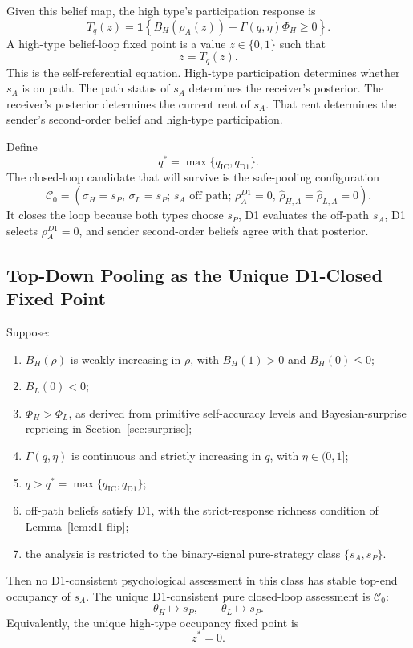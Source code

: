 Given this belief map, the high type's participation response is
\[
T_q(z)
=
\mathbf{1}\left\{
B_H(\rho_A(z))-\Gamma(q,\eta)\Phi_H\ge 0
\right\}.
\]
A high-type belief-loop fixed point is a value \(z\in\{0,1\}\) such that
\[
z=T_q(z).
\]
This is the self-referential equation. High-type participation determines whether \(s_A\) is on path. The path status of \(s_A\) determines the receiver's posterior. The receiver's posterior determines the current rent of \(s_A\). That rent determines the sender's second-order belief and high-type participation.

Define
\[
q^*=\max\{q_{\mathrm{IC}},q_{\mathrm{D1}}\}.
\]
The closed-loop candidate that will survive is the safe-pooling configuration
\[
\mathcal C_0
=
\left(
\sigma_H=s_P,\,
\sigma_L=s_P;\,
s_A\text{ off path};\,
\rho_A^{D1}=0,\,
\widehat\rho_{H,A}=\widehat\rho_{L,A}=0
\right).
\]
It closes the loop because both types choose \(s_P\), D1 evaluates the off-path \(s_A\), D1 selects \(\rho_A^{D1}=0\), and sender second-order beliefs agree with that posterior.

\subsection{Top-Down Pooling as the Unique D1-Closed Fixed Point}
\label{subsec:d1-closed-fixed-point}

\begin{theorem}
\label{thm:top-down-pooling}
Suppose:
\begin{enumerate}
\item \(B_H(\rho)\) is weakly increasing in \(\rho\), with \(B_H(1)>0\) and \(B_H(0)\le 0\);
\item \(B_L(0)<0\);
\item \(\Phi_H>\Phi_L\), as derived from primitive self-accuracy levels and Bayesian-surprise repricing in Section~\ref{sec:surprise};
\item \(\Gamma(q,\eta)\) is continuous and strictly increasing in \(q\), with \(\eta\in(0,1]\);
\item \(q>q^*=\max\{q_{\mathrm{IC}},q_{\mathrm{D1}}\}\);
\item off-path beliefs satisfy D1, with the strict-response richness condition of Lemma~\ref{lem:d1-flip};
\item the analysis is restricted to the binary-signal pure-strategy class \(\{s_A,s_P\}\).
\end{enumerate}
Then no D1-consistent psychological assessment in this class has stable top-end occupancy of \(s_A\). The unique D1-consistent pure closed-loop assessment is \(\mathcal C_0\):
\[
\theta_H\mapsto s_P,
\qquad
\theta_L\mapsto s_P.
\]
Equivalently, the unique high-type occupancy fixed point is
\[
z^*=0.
\]
\end{theorem}

